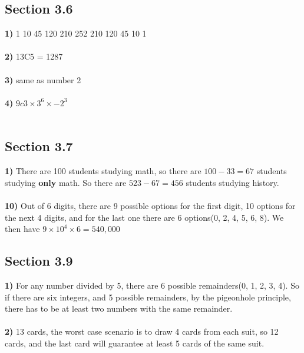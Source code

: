 \documentclass[12pt]{article}
\begin{document}
\subsection*{Section 3.6}
\textbf{1)} 1 10 45 120 210 252 210 120 45 10 1\\\\
\textbf{2)} 13C5 = 1287\\\\
\textbf{3)} same as number 2\\\\
\textbf{4)} $9c3 \times 3^{6} \times -2^{3}$\\\\



\subsection*{Section 3.7}
\textbf{1)} There are 100 students studying math, so there are $100 - 33 = 67$ students studying \textbf{only} math. So there are $523 - 67 = 456$ students studying history.\\\\
\textbf{10)} Out of 6 digits, there are 9 possible options for the first digit, 10 options for the next 4 digits, and for the last one there are 6 options(0, 2, 4, 5, 6, 8). We then have $9 \times 10^{4} \times 6 = 540,000$


\subsection*{Section 3.9}
\textbf{1)} For any number divided by 5, there are 6 possible remainders(0, 1, 2, 3, 4). So if there are six integers, and 5 possible remainders, by the pigeonhole principle, there has to be at least two numbers with the same remainder.\\\\
\textbf{2)} 13 cards, the worst case scenario is to draw 4 cards from each suit, so 12 cards, and the last card will guarantee at least 5 cards of the same suit.
\end{document}
